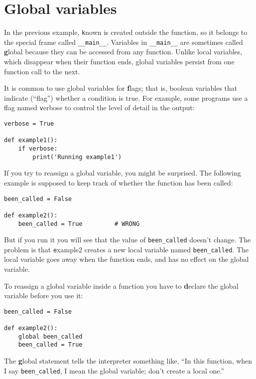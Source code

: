 \documentclass[
DIV=11,
fontsize=12,
twoside,
headinclude=false,
titlepage=firstiscover,
abstract=true,
headsepline=true,
footsepline=true,
chapterprefix=true, %
headings=big,
bibliography=totoc,%
captions=tableheading
]{scrbook}
\theoremstyle{definition}
\begin{document}
\section{Global variables}

In the previous example, {\texttt known} is created outside the function,
so it belongs to the special frame called \verb"__main__".
Variables in \verb"__main__" are sometimes called {\textbf global}
because they can be accessed from any function.  Unlike local
variables, which disappear when their function ends, global variables
persist from one function call to the next.

It is common to use global variables for {\textbf flags}; that is, 
boolean variables that indicate (``flag'') whether a condition
is true.  For example, some programs use
a flag named {\texttt verbose} to control the level of detail in the
output:

\begin{lstlisting}
verbose = True

def example1():
    if verbose:
        print('Running example1')
\end{lstlisting}
%
If you try to reassign a global variable, you might be surprised.
The following example is supposed to keep track of whether the
function has been called:

\begin{lstlisting}
been_called = False

def example2():
    been_called = True         # WRONG
\end{lstlisting}
%
But if you run it you will see that the value of \verb"been_called"
doesn't change.  The problem is that {\texttt example2} creates a new local
variable named \verb"been_called".  The local variable goes away when
the function ends, and has no effect on the global variable.

To reassign a global variable inside a function you have to
{\textbf declare} the global variable before you use it:

\begin{lstlisting}
been_called = False

def example2():
    global been_called 
    been_called = True
\end{lstlisting}
%
The {\textbf global statement} tells the interpreter
something like, ``In this function, when I say \verb"been_called", I
mean the global variable; don't create a local one.''
\end{document}
